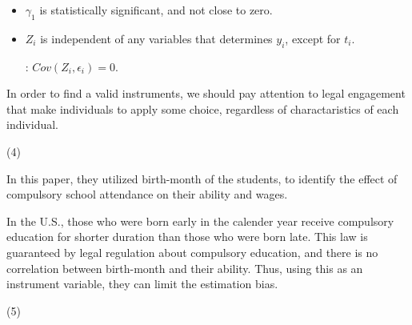 \documentclass{jsarticle}
\begin{document}
\begin{enumerate}
  \begin{itemize}
  
  \item $\gamma_1$ is statistically significant, and not close to zero.
  
  \item $Z_i$ is independent of any variables that determines $y_i$, except for $t_i$.
  
  : $Cov(Z_i, \epsilon_i) = 0$.
  
  \end{itemize} 
 
 In order to find a valid instruments, we should pay attention to legal engagement that make individuals to apply some choice, regardless of charactaristics of each individual. 
 
 (4)
 
 In this paper, they utilized birth-month of the students, to identify the effect of compulsory school attendance on their ability and wages.
 
 In the U.S., those who were born early in the calender year receive compulsory education for shorter duration than those who were born late. This law is guaranteed by legal regulation about compulsory education, and there is no correlation between birth-month and their ability. Thus, using this as an instrument variable, they can limit the estimation bias.
 
 (5)
 
 
 
 \end{enumerate}
\end{document}
